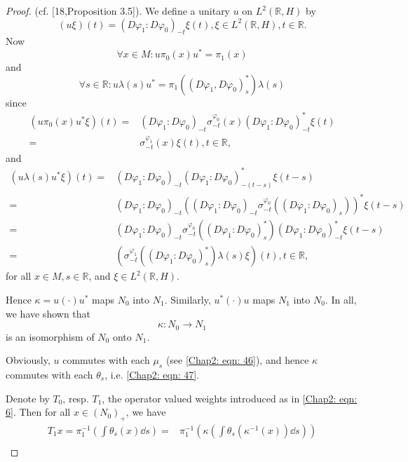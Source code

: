 \begin{proof}
    (cf. [18,Proposition 3.5]). We define a unitary $u$ on $L^2(\mathbb{R},H)$ by
    \[
        (u\xi)(t)=(D\varphi_1:D\varphi_0)_{-t}\xi(t),\xi\in L^2(\mathbb{R},H), t\in \mathbb{R}.
    \]
    Now
    \begin{equation}
        \forall x\in M: u\pi_0(x)u^*=\pi_1(x)
    \end{equation}
    and
    \begin{equation}
        \forall s\in \mathbb{R}:u\lambda(s)u^*=\pi_1((D\varphi_1,D\varphi_0)_s^*)\lambda(s)
    \end{equation}
    since
    \[
        \begin{split}
            (u\pi_0(x)u^*\xi)(t)=&(D\varphi_1:D\varphi_0)_{-t}\sigma_{-t}^{\varphi_0}(x)(D\varphi_1:D\varphi_0)_{-t}^*\xi(t)\\
            =&\sigma_{-t}^{\varphi_1}(x)\xi(t),t\in \mathbb{R},
        \end{split}
    \]
    and
    \[
        \begin{split}
            (u\lambda(s)u^* \xi)(t)=&(D\varphi_1:D\varphi_0)_{-t}(D\varphi_1:D\varphi_0)_{-(t-s)}^*\xi(t-s)\\
            =&(D\varphi_1:D\varphi_0)_{-t}((D\varphi_1:D\varphi_0)_{-t}\sigma_{-t}^{\varphi_0}((D\varphi_1:D\varphi_0)_{s}))^*\xi(t-s)\\
            =&(D\varphi_1:D\varphi_0)_{-t}\sigma_{-t}^{\varphi_0}((D\varphi_1:D\varphi_0)_{s}^*)(D\varphi_1:D\varphi_0)_{-t}^*\xi(t-s)\\
            =&(\sigma_{-t}^{\varphi_1}((D\varphi_1:D\varphi_0)_{s}^*)\lambda(s)\xi)(t),t\in \mathbb{R},
        \end{split}
    \]
    for all $x\in M,s\in \mathbb{R}$, and $\xi\in L^2(\mathbb{R},H)$.\par
    Hence $\kappa=u(\cdot)u^*$ maps $N_0$ into $N_1$. Similarly, $u^*(\cdot)u$ maps $N_1$ into $N_0$. In all, we have shown that
    \[
        \kappa:N_0\to N_1
    \]
    {\color{red} is} an isomorphism of $N_0$ onto $N_1$.\par
    Obviously, $u$ commutes with each $\mu_s$ (see \eqref{Chap2: eqn: 46}), and hence $\kappa$ commutes with each $\theta_s$, i.e. \eqref{Chap2: eqn: 47}.\par
    Denote by $T_0$, resp. $T_1$, the operator valued weights introduced as in \eqref{Chap2: eqn: 6}. Then for all $x\in(N_0)_+$, we have
    \[
        \begin{split}
            T_1x=\pi_1^{-1}(\int \theta_s(x)\dd s)=&\pi_1^{-1}(\kappa(\int \theta_s (\kappa^{-1}(x))\dd s))\\

\end{split}\]
\end{proof}
